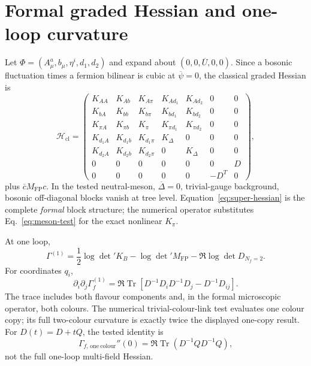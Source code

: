\documentclass[11pt]{article}
\theoremstyle{definition}
\theoremstyle{remark}
\newcommand{\Tr}{\operatorname{Tr}}
\newcommand{\cH}{\mathcal H}
\begin{document}
\section{Formal graded Hessian and one-loop curvature}

Let \(\Phi=(A_\mu^a,b_\mu,\eta^i,d_1,d_2)\) and expand about
\((0,0,\overline U,0,0)\).  Since a bosonic fluctuation times a fermion
bilinear is cubic at \(\overline\psi=0\), the classical graded Hessian is
\begin{equation}
 \cH_{\mathrm{cl}}=
 \left(
 \begin{array}{ccccc|cc}
 K_{AA}&K_{Ab}&K_{A\pi}&K_{Ad_1}&K_{Ad_2}&0&0\\
 K_{bA}&K_{bb}&K_{b\pi}&K_{bd_1}&K_{bd_2}&0&0\\
 K_{\pi A}&K_{\pi b}&K_\pi&K_{\pi d_1}&K_{\pi d_2}&0&0\\
 K_{d_1A}&K_{d_1b}&K_{d_1\pi}&K_\Delta&0&0&0\\
 K_{d_2A}&K_{d_2b}&K_{d_2\pi}&0&K_\Delta&0&0\\ \hline
 0&0&0&0&0&0&D\\
 0&0&0&0&0&-D^T&0
 \end{array}\right),
 \label{eq:super-hessian}
\end{equation}
plus \(\overline cM_{\mathrm{FP}}c\).  In the tested neutral-meson,
\(\overline\Delta=0\), trivial-gauge background, bosonic off-diagonal
blocks vanish at tree level.  Equation~\eqref{eq:super-hessian} is the
complete \emph{formal} block structure; the numerical operator substitutes
Eq.~\eqref{eq:meson-test} for the exact nonlinear \(K_\pi\).

At one loop,
\begin{equation}
 \Gamma^{(1)}=\frac12\log\det'K_B-\log\det'M_{\mathrm{FP}}
 -\Re\log\det D_{N_f=2}.
 \label{eq:one-loop}
\end{equation}
For coordinates \(q_i\),
\begin{equation}
 \partial_i\partial_j\Gamma_f^{(1)}
 =\Re\Tr[D^{-1}D_iD^{-1}D_j-D^{-1}D_{ij}].
 \label{eq:curvature}
\end{equation}
The trace includes both flavour components and, in the formal microscopic
operator, both colours.  The numerical trivial-colour-link test evaluates one
colour copy; its full two-colour curvature is exactly twice the displayed
one-copy result.  For \(D(t)=D+tQ\), the tested identity is
\begin{equation}
 \Gamma_{f,\,\mathrm{one\ colour}}''(0)
 =\Re\Tr(D^{-1}QD^{-1}Q),
 \label{eq:trace-test}
\end{equation}
not the full one-loop multi-field Hessian.
\end{document}
